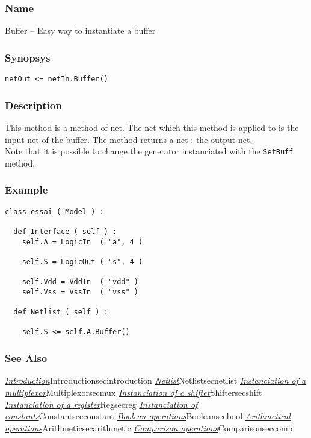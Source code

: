 \subsubsection{Name}

Buffer -- Easy way to instantiate a buffer

\subsubsection{Synopsys}

\begin{verbatim}
netOut <= netIn.Buffer()
\end{verbatim}
  
\subsubsection{Description}

This method is a method of net. The net which this method is applied to is the input net of the buffer. The method returns a net : the output net.\\
\indent Note that it is possible to change the generator instanciated with the \verb-SetBuff- method.

\subsubsection{Example}

\begin{verbatim}
class essai ( Model ) :

  def Interface ( self ) :
    self.A = LogicIn  ( "a", 4 )
    
    self.S = LogicOut ( "s", 4 )

    self.Vdd = VddIn  ( "vdd" )
    self.Vss = VssIn  ( "vss" )
	
  def Netlist ( self ) :

    self.S <= self.A.Buffer() 
\end{verbatim}
    
\subsubsection{See Also}

\hyperref[ref]{\emph{Introduction}}{}{Introduction}{secintroduction}
\hyperref[ref]{\emph{Netlist}}{}{Netlist}{secnetlist}
\hyperref[ref]{\emph{Instanciation of a multiplexor}}{}{Multiplexor}{secmux}
\hyperref[ref]{\emph{Instanciation of a shifter}}{}{Shifter}{secshift}
\hyperref[ref]{\emph{Instanciation of a register}}{}{Reg}{secreg}
\hyperref[ref]{\emph{Instanciation of constants}}{}{Constant}{secconstant}
\hyperref[ref]{\emph{Boolean operations}}{}{Boolean}{secbool}
\hyperref[ref]{\emph{Arithmetical operations}}{}{Arithmetic}{secarithmetic}
\hyperref[ref]{\emph{Comparison operations}}{}{Comparison}{seccomp}
